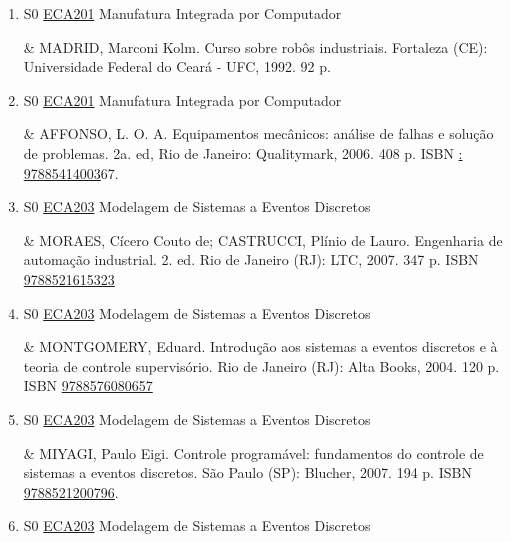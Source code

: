 \documentclass[12pt,a4paper]{book}
\begin{document}
\begin{enumerate}
&  GROOVER, Mikell P.  Automação Industrial e Sistemas de Manufatura.  3ed.  São Paulo: Pearson, 2011.  581 p.  ISBN \href{http://www.bn.br/site/pages/servicosProfissionais/agenciaISBN/isbnBusca/FbnBuscaISBNCatalogo.asp?pField=ISBN&pIntPagina=1&pISBN=76058717&nidbISBN=true&hidbISBN=true}{9788576058717}
 

 \item S0 \hyperref[PUD:ECA201]{ECA201} Manufatura Integrada por Computador

&  MADRID, Marconi Kolm.  Curso sobre robôs industriais.  Fortaleza (CE): Universidade Federal do Ceará - UFC, 1992.  92 p. 
 

 \item S0 \hyperref[PUD:ECA201]{ECA201} Manufatura Integrada por Computador

&  AFFONSO, L.  O.  A.  Equipamentos mecânicos: análise de falhas e solução de problemas.  2a.  ed, Rio de Janeiro: Qualitymark, 2006.  408 p.  ISBN \href{http://www.google.com/search?hl=pt-BR&tbo=p&tbm=bks&q=isbn:: 97885414003&num=10}{: 97885414003}67.
 \item S0 \hyperref[PUD:ECA203]{ECA203} Modelagem de Sistemas a Eventos Discretos

& MORAES, Cícero Couto de;  CASTRUCCI, Plínio de Lauro.  Engenharia de automação industrial.  2. ed.  Rio de Janeiro (RJ): LTC, 2007.  347 p.  ISBN \href{http://www.bn.br/site/pages/servicosProfissionais/agenciaISBN/isbnBusca/FbnBuscaISBNCatalogo.asp?pField=ISBN&pIntPagina=1&pISBN=21615323&nidbISBN=true&hidbISBN=true}{9788521615323}
 

 \item S0 \hyperref[PUD:ECA203]{ECA203} Modelagem de Sistemas a Eventos Discretos

&  MONTGOMERY, Eduard.  Introdução aos sistemas a eventos discretos e à teoria de controle supervisório.  Rio de Janeiro (RJ): Alta Books, 2004.  120 p.  ISBN \href{http://www.bn.br/site/pages/servicosProfissionais/agenciaISBN/isbnBusca/FbnBuscaISBNCatalogo.asp?pField=ISBN&pIntPagina=1&pISBN=76080657&nidbISBN=true&hidbISBN=true}{9788576080657}
 

 \item S0 \hyperref[PUD:ECA203]{ECA203} Modelagem de Sistemas a Eventos Discretos

&  MIYAGI, Paulo Eigi.  Controle programável: fundamentos do controle de sistemas a eventos discretos.  São Paulo (SP): Blucher, 2007.  194 p.  ISBN \href{http://www.bn.br/site/pages/servicosProfissionais/agenciaISBN/isbnBusca/FbnBuscaISBNCatalogo.asp?pField=ISBN&pIntPagina=1&pISBN=21200796&nidbISBN=true&hidbISBN=true}{9788521200796}.
 \item S0 \hyperref[PUD:ECA203]{ECA203} Modelagem de Sistemas a Eventos Discretos


\end{enumerate}
\end{document}
